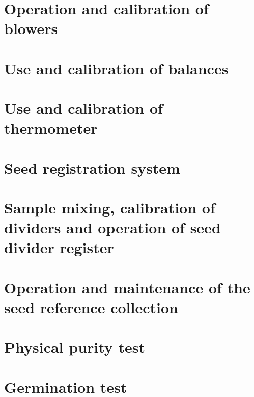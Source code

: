 \documentclass[
]{book}
\begin{document}
\hypertarget{operation-and-calibration-of-blowers}{%
\chapter{Operation and calibration of blowers}\label{operation-and-calibration-of-blowers}}

\hypertarget{use-and-calibration-of-balances}{%
\chapter{Use and calibration of balances}\label{use-and-calibration-of-balances}}

\hypertarget{use-and-calibration-of-thermometer}{%
\chapter{Use and calibration of thermometer}\label{use-and-calibration-of-thermometer}}

\hypertarget{seed-registration-system}{%
\chapter{Seed registration system}\label{seed-registration-system}}

\hypertarget{sample-mixing-calibration-of-dividers-and-operation-of-seed-divider-register}{%
\chapter{Sample mixing, calibration of dividers and operation of seed divider register}\label{sample-mixing-calibration-of-dividers-and-operation-of-seed-divider-register}}

\hypertarget{operation-and-maintenance-of-the-seed-reference-collection}{%
\chapter{Operation and maintenance of the seed reference collection}\label{operation-and-maintenance-of-the-seed-reference-collection}}

\hypertarget{physical-purity-test}{%
\chapter{Physical purity test}\label{physical-purity-test}}

\hypertarget{germination-test}{%
\chapter{Germination test}\label{germination-test}}
\end{document}
